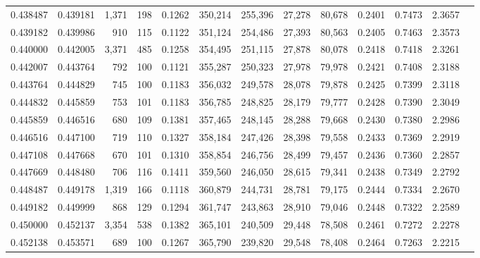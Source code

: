 \begin{tabular}{rrrrrrrrrrrrr}
0.438487 & 0.439181 & 1,371 & 198 &                                     0.1262 & 350,214 & 255,396 &  27,278 &  80,678 & 0.2401 & 0.7473 & 2.3657 \\
0.439182 & 0.439986 &   910 & 115 &                                     0.1122 & 351,124 & 254,486 &  27,393 &  80,563 & 0.2405 & 0.7463 & 2.3573 \\
0.440000 & 0.442005 & 3,371 & 485 &                                     0.1258 & 354,495 & 251,115 &  27,878 &  80,078 & 0.2418 & 0.7418 & 2.3261 \\
0.442007 & 0.443764 &   792 & 100 &                                     0.1121 & 355,287 & 250,323 &  27,978 &  79,978 & 0.2421 & 0.7408 & 2.3188 \\
0.443764 & 0.444829 &   745 & 100 &                                     0.1183 & 356,032 & 249,578 &  28,078 &  79,878 & 0.2425 & 0.7399 & 2.3118 \\
0.444832 & 0.445859 &   753 & 101 &                                     0.1183 & 356,785 & 248,825 &  28,179 &  79,777 & 0.2428 & 0.7390 & 2.3049 \\
0.445859 & 0.446516 &   680 & 109 &                                     0.1381 & 357,465 & 248,145 &  28,288 &  79,668 & 0.2430 & 0.7380 & 2.2986 \\
0.446516 & 0.447100 &   719 & 110 &                                     0.1327 & 358,184 & 247,426 &  28,398 &  79,558 & 0.2433 & 0.7369 & 2.2919 \\
0.447108 & 0.447668 &   670 & 101 &                                     0.1310 & 358,854 & 246,756 &  28,499 &  79,457 & 0.2436 & 0.7360 & 2.2857 \\
0.447669 & 0.448480 &   706 & 116 &                                     0.1411 & 359,560 & 246,050 &  28,615 &  79,341 & 0.2438 & 0.7349 & 2.2792 \\
0.448487 & 0.449178 & 1,319 & 166 &                                     0.1118 & 360,879 & 244,731 &  28,781 &  79,175 & 0.2444 & 0.7334 & 2.2670 \\
0.449182 & 0.449999 &   868 & 129 &                                     0.1294 & 361,747 & 243,863 &  28,910 &  79,046 & 0.2448 & 0.7322 & 2.2589 \\
0.450000 & 0.452137 & 3,354 & 538 &                                     0.1382 & 365,101 & 240,509 &  29,448 &  78,508 & 0.2461 & 0.7272 & 2.2278 \\
0.452138 & 0.453571 &   689 & 100 &                                     0.1267 & 365,790 & 239,820 &  29,548 &  78,408 & 0.2464 & 0.7263 & 2.2215 \\

\end{tabular}
